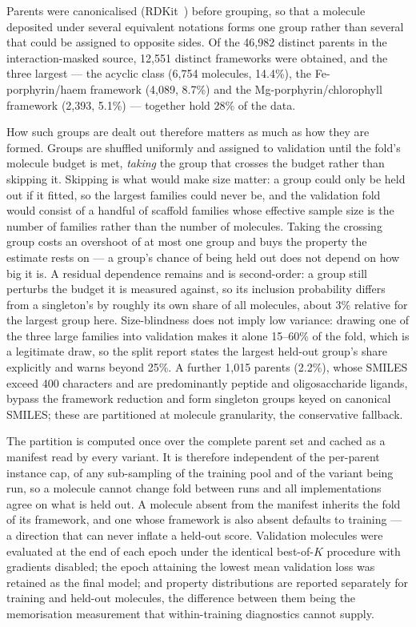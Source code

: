 \documentclass[a4paper,12pt]{article}
\begin{document}
Parents were canonicalised (RDKit~\cite{rdkit}) before grouping, so that a
molecule deposited under several equivalent notations forms one group rather
than several that could be assigned to opposite sides. Of the 46{,}982 distinct
parents in the interaction-masked source, 12{,}551 distinct frameworks were
obtained, and the three largest --- the acyclic class (6{,}754 molecules,
14.4\%), the Fe-porphyrin/haem framework (4{,}089, 8.7\%) and the
Mg-porphyrin/chlorophyll framework (2{,}393, 5.1\%) --- together hold 28\% of
the data.

How such groups are dealt out therefore matters as much as how they are formed.
Groups are shuffled uniformly and assigned to validation until the fold's
molecule budget is met, \emph{taking} the group that crosses the budget rather
than skipping it. Skipping is what would make size matter: a group could only be
held out if it fitted, so the largest families could never be, and the
validation fold would consist of a handful of scaffold families whose effective
sample size is the number of families rather than the number of molecules.
Taking the crossing group costs an overshoot of at most one group and buys the
property the estimate rests on --- a group's chance of being held out does not
depend on how big it is. A residual dependence remains and is second-order: a
group still perturbs the budget it is measured against, so its inclusion
probability differs from a singleton's by roughly its own share of all
molecules, about 3\% relative for the largest group here. Size-blindness does
not imply low variance: drawing one of the three large families into validation
makes it alone 15--60\% of the fold, which is a legitimate draw, so the split
report states the largest held-out group's share explicitly and warns beyond
25\%. A further 1{,}015 parents (2.2\%), whose SMILES exceed 400 characters and
are predominantly peptide and oligosaccharide ligands, bypass the framework
reduction and form singleton groups keyed on canonical SMILES; these are
partitioned at molecule granularity, the conservative fallback.

The partition is computed once over the complete parent set and cached as a
manifest read by every variant. It is therefore independent of the per-parent
instance cap, of any sub-sampling of the training pool and of the variant being
run, so a molecule cannot change fold between runs and all implementations agree
on what is held out. A molecule absent from the manifest inherits the fold of
its framework, and one whose framework is also absent defaults to training --- a
direction that can never inflate a held-out score. Validation molecules were
evaluated at the end of each epoch under the identical best-of-$K$ procedure
with gradients disabled; the epoch attaining the lowest mean validation loss was
retained as the final model; and property distributions are reported separately
for training and held-out molecules, the difference between them being the
memorisation measurement that within-training diagnostics cannot supply.
\end{document}

